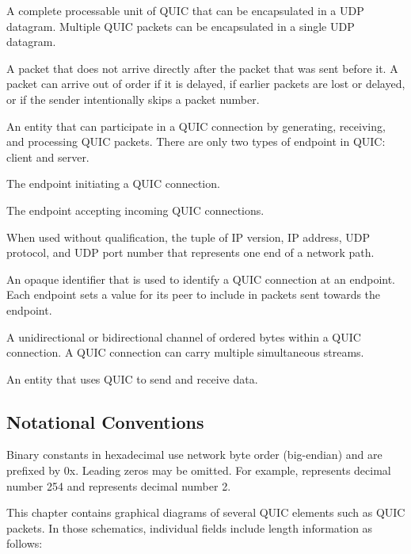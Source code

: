 
\begin{description}

    A complete processable unit of QUIC that can be
    encapsulated in a UDP datagram.  Multiple QUIC packets can be
    encapsulated in a single UDP datagram.

    A packet that does not arrive directly after the packet that was
    sent before it.  A packet can arrive out of order if it is delayed, if earlier packets are
    lost or delayed, or if the sender intentionally skips a packet number.

     An entity that can participate in a QUIC connection by
      generating, receiving, and processing QUIC packets.  There are
      only two types of endpoint in QUIC: client and server.

     The endpoint initiating a QUIC connection.

     The endpoint accepting incoming QUIC connections.

    When used without qualification, the tuple of IP version,
    IP address, UDP protocol, and UDP port number that represents one
    end of a network path.

    An opaque identifier that is used to identify a QUIC
    connection at an endpoint.  Each endpoint sets a value for its
    peer to include in packets sent towards the endpoint.

    A unidirectional or bidirectional channel of ordered bytes
    within a QUIC connection.  A QUIC connection can carry multiple
    simultaneous streams.

    An entity that uses QUIC to send and receive data.

\end{description}

\subsection{Notational Conventions}

Binary constants in hexadecimal use network byte order (big-endian) and are prefixed by 0x. Leading
zeros may be omitted. For example,  represents decimal number 254 and 
represents decimal number 2.

This chapter contains graphical diagrams of several QUIC elements such as QUIC packets. In those
schematics, individual fields include length information as follows:

